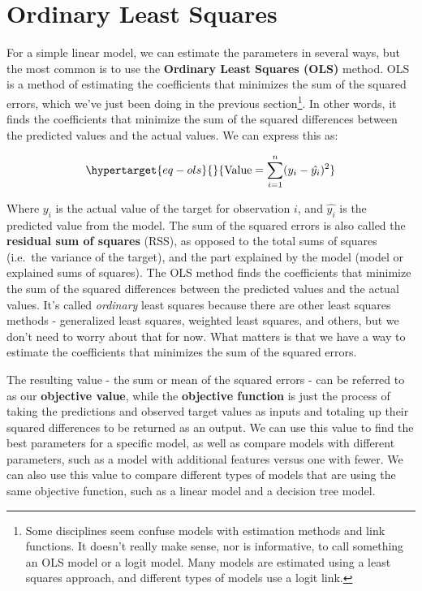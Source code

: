 \documentclass[
  letterpaper,
]{krantz}
\begin{document}
\section{Ordinary Least Squares}\label{sec-estim-ols}

For a simple linear model, we can estimate the parameters in several
ways, but the most common is to use the \textbf{Ordinary Least Squares
(OLS)} method. OLS is a method of estimating the coefficients that
minimizes the sum of the squared errors, which we've just been doing in
the previous section\footnote{Some disciplines seem confuse models with
  estimation methods and link functions. It doesn't really make sense,
  nor is informative, to call something an OLS model or a logit model.
  Many models are estimated using a least squares approach, and
  different types of models use a logit link.}. In other words, it finds
the coefficients that minimize the sum of the squared differences
between the predicted values and the actual values. We can express this
as:

\begin{equation}\protect\hypertarget{eq-ols}{}{
\textrm{Value} = \sum_{i=1}^{n} (y_i - \hat{y_i})^2
}\label{eq-ols}\end{equation}

Where \(y_i\) is the actual value of the target for observation \(i\),
and \(\hat{y_i}\) is the predicted value from the model. The sum of the
squared errors is also called the \textbf{residual sum of squares}
(RSS), as opposed to the total sums of squares (i.e.~the variance of the
target), and the part explained by the model (model or explained sums of
squares). The OLS method finds the coefficients that minimize the sum of
the squared differences between the predicted values and the actual
values. It's called \emph{ordinary} least squares because there are
other least squares methods - generalized least squares, weighted least
squares, and others, but we don't need to worry about that for now. What
matters is that we have a way to estimate the coefficients that
minimizes the sum of the squared errors.

The resulting value - the sum or mean of the squared errors - can be
referred to as our \textbf{objective value}, while the \textbf{objective
function} is just the process of taking the predictions and observed
target values as inputs and totaling up their squared differences to be
returned as an output. We can use this value to find the best parameters
for a specific model, as well as compare models with different
parameters, such as a model with additional features versus one with
fewer. We can also use this value to compare different types of models
that are using the same objective function, such as a linear model and a
decision tree model.
\end{document}
